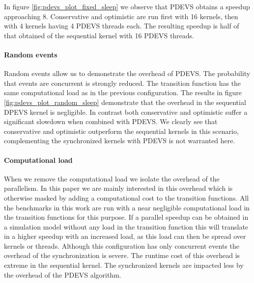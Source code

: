 In figure \ref{fig:pdevs_plot_fixed_sleep} we observe that PDEVS obtains a speedup approaching 8. 
Conservative and optimistic are run first with 16 kernels, then with 4 kernels having 4  PDEVS threads each. 
The resulting speedup is half of that obtained of the sequential kernel with 16 PDEVS threads.

\paragraph{Random events}
Random events allow us to demonstrate the overhead of PDEVS. The probability that events are concurrent is strongly reduced.
The transition function has the same computational load as in the previous configuration. 
The results in figure \ref{fig:pdevs_plot_random_sleep} demonstrate that the overhead in the sequential DPEVS kernel is negligible. In contrast both conservative and optimistic suffer a significant slowdown when combined with PDEVS.
We clearly see that conservative and optimistic outperform the sequential kernels in this scenario, complementing the synchronized kernels with PDEVS is not warranted here.

\paragraph{Computational load}
When we remove the computational load we isolate the overhead of the parallelism. 
In this paper we are mainly interested in this overhead which is otherwise masked by adding a computational cost to the transition functions. 
All the benchmarks in this work are run with a near negligible computational load in the transition functions for this purpose.
If a parallel speedup can be obtained in a simulation model without any load in the transition function this will translate in a higher speedup with an increased load, as this load can then be spread over kernels or threads.
Although this configuration has only concurrent events the overhead of the synchronization is severe. 
The runtime cost of this overhead is extreme in the sequential kernel. 
The synchronized kernels are impacted less by the overhead of the PDEVS algorithm.
 
